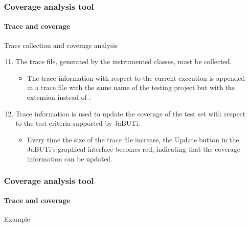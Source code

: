 \begin{frame}
\frametitle{Coverage analysis tool}
\framesubtitle{Trace and coverage}

\begin{block:procedure}{Trace collection and coverage analysis}
\begin{enumerate}
	\setcounter{enumi}{10}
	\item The trace file, generated by the instrumented classes, must be
	collected.
	\begin{itemize}
		\item The trace information with respect to the current execution is
		appended in a trace file with the same name of the testing project but
		with the extension  instead of .
	\end{itemize}

	\item Trace information is used to update the coverage of the test set
	with respect to the test criteria supported by JaBUTi.
	\begin{itemize}
		\item Every time the size of the trace file increase, the Update button
		in the JaBUTi's graphical interface becomes red, indicating that the
		coverage information can be updated.
	\end{itemize}
\end{enumerate}
\end{block:procedure}
\end{frame}



\begin{frame}
\frametitle{Coverage analysis tool}
\framesubtitle{Trace and coverage}

\begin{block:ie}{Example}
\end{block:ie}
\end{frame}
